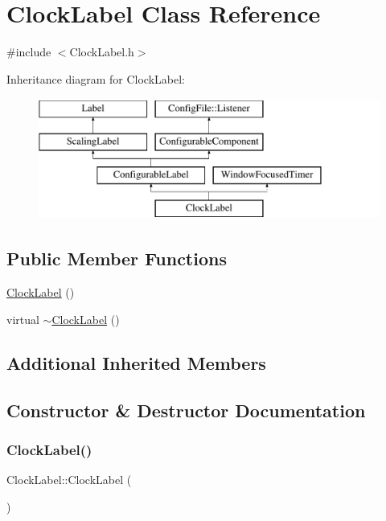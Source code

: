 \hypertarget{classClockLabel}{}\section{Clock\+Label Class Reference}
\label{classClockLabel}


{\ttfamily \#include $<$Clock\+Label.\+h$>$}

Inheritance diagram for Clock\+Label\+:\begin{figure}[H]
\begin{center}
\leavevmode
\includegraphics[height=4.000000cm]{classClockLabel}
\end{center}
\end{figure}
\subsection*{Public Member Functions}
\begin{DoxyCompactItemize}
\item 
\mbox{\hyperlink{classClockLabel_a52d8b5127aac3c1ded8200dd24cb7823}{Clock\+Label}} ()
\item 
virtual \mbox{\hyperlink{classClockLabel_acb17321406fe48ca0cac19e06ba193b0}{$\sim$\+Clock\+Label}} ()
\end{DoxyCompactItemize}
\subsection*{Additional Inherited Members}


\subsection{Constructor \& Destructor Documentation}
\mbox{\label{classClockLabel_a52d8b5127aac3c1ded8200dd24cb7823}} 
\subsubsection{\texorpdfstring{Clock\+Label()}{ClockLabel()}}
{\footnotesize\ttfamily Clock\+Label\+::\+Clock\+Label (\begin{DoxyParamCaption}{ }\end{DoxyParamCaption})}


